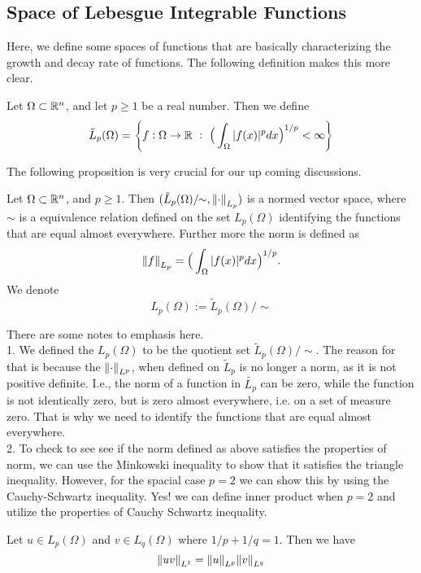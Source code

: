\subsection{Space of Lebesgue Integrable Functions}
Here, we define some spaces of functions that are basically characterizing the growth and decay rate of functions. The following definition makes this more clear. 
\begin{definition}
	Let $ \Omega \subset \mathbb{R}^n $, and let $ p\geq 1 $ be a real number. Then we define
	\[ \tilde{L}_p(\Omega) = \Set{f:\Omega\to\R\ :\ \big(\int_\Omega \abs{f(x)}^p dx \big)^{1/p} < \infty} \]
\end{definition}

The following proposition is very crucial for our up coming discussions.
\begin{proposition}
	Let $ \Omega \subset \mathbb{R}^n $, and $ p\geq 1 $. Then $ (\tilde{L}_p(\Omega)/\!\!\sim, \norm{\cdot}_{L_p}) $ is a normed vector space, where $ \sim $ is a equivalence relation defined on the set $ L_p(\Omega) $ identifying the functions that are equal almost everywhere. Further more the norm is defined as
	\[ \norm{f}_{L_p} = \big(\int_\Omega |f(x)|^p dx\big)^{1/p}.\]
	We denote 
	\[  L_p(\Omega) :=  \tilde{L}_p(\Omega)/\!\!\sim \]
\end{proposition}
\begin{remark}
	There are some notes to emphasis here. \\
	1. We defined the $ L_p(\Omega) $ to be the quotient set $ \tilde{L}_p(\Omega)/\!\!\sim  $. The reason for that is because the $ \norm{\cdot}_{L^p} $, when defined on $\tilde{L}_p$ is no longer a norm, as it is not positive definite. I.e., the norm of a function in $ \tilde{L_p} $ can be zero, while the function is not identically zero, but is zero almost everywhere, i.e. on a set of measure zero. That is why we need to identify the functions that are equal almost everywhere. \\
	2. To check to see see if the norm defined as above satisfies the properties of norm, we can use the Minkowski inequality to show that it satisfies the triangle inequality. However, for the spacial case $ p=2 $ we can show this by using the Cauchy-Schwartz inequality. Yes! we can define inner product when $ p=2 $ and utilize the properties of Cauchy Schwartz inequality.
\end{remark}

\begin{proposition}
	Let $ u\in L_p(\Omega) $ and $ v \in L_q(\Omega) $ where $ 1/p + 1/q = 1. $
	Then we have
	\[ \norm{uv}_{L^1} = \norm{u}_{L^p} \norm{v}_{L^q} \]
\end{proposition}

